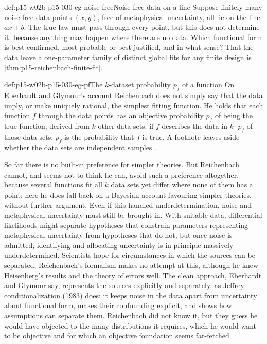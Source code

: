 \begin{hbexample}{def:p15-w02b-p15-030-eg-noise-free}{Noise-free data on a line}
Suppose finitely many noise-free data points \((x,y)\), free of
metaphysical uncertainty, all lie on the line \(ax+b\). The true law
must pass through every point, but this does not determine it, because
anything may happen where there are no data. Which functional form is
best confirmed, most probable or best justified, and in what sense?
\cite[pp.~385--386]{EberhardtGlymour2011ReichenbachReading} That the data
leave a one-parameter family of distinct global fits for any finite
design is \cref{thm:p15-reichenbach-finite-fit}.
\end{hbexample}

\begin{hbdefinition}{def:p15-w02b-p15-030-eg-pf}{The \(k\)-dataset probability \(p_f\) of a function}
On Eberhardt and Glymour's account Reichenbach does not simply say that the data
imply, or make uniquely rational, the simplest fitting function. He holds
that each function \(f\) through the data points has an objective
probability \(p_f\) of being the true function, derived from \(k\) other
data sets: if \(f\) describes the data in \(k\cdot p_f\) of those data
sets, \(p_f\) is the probability that \(f\) is true. A footnote leaves
aside whether the data sets are independent samples
\cite[p.~386 and n.~16]{EberhardtGlymour2011ReichenbachReading}.
\end{hbdefinition}

So far there is no built-in preference for simpler theories. But
Reichenbach cannot, and seems not to think he can, avoid such a
preference altogether, because several functions fit all \(k\) data sets
yet differ where none of them has a point; here he does fall back on a
Bayesian account favouring simpler theories, without further argument.
Even if this handled underdetermination, noise and metaphysical
uncertainty must still be brought in. With suitable data, differential
likelihoods might separate hypotheses that constrain parameters
representing metaphysical uncertainty from hypotheses that do not; but
once noise is admitted, identifying and allocating uncertainty is in
principle massively underdetermined. Scientists hope for circumstances in
which the sources can be separated; Reichenbach's formalism makes no
attempt at this, although he knew Heisenberg's results and the theory of
errors well. The clean approach, Eberhardt and Glymour say, represents the sources
explicitly and separately, as Jeffrey conditionalization (1983) does: it
keeps noise in the data apart from uncertainty about functional form,
makes their confounding explicit, and shows how assumptions can separate
them. Reichenbach did not know it, but they guess he would have objected
to the many distributions it requires, which he would want to be
objective and for which an objective foundation seems far-fetched
\cite[p.~386]{EberhardtGlymour2011ReichenbachReading}.

